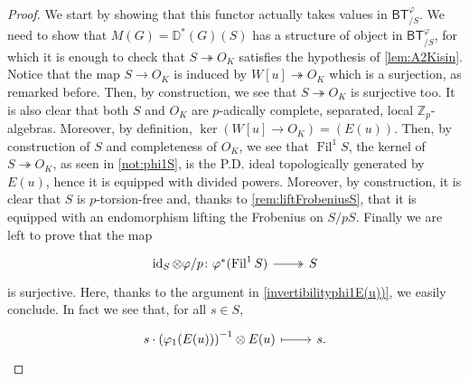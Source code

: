 \begin{proof}%
We start by showing that this functor actually takes values in $\mathsf{BT}^{\varphi}_{/S}$.
We need to show that $M(G) = \mathbb{D}^{*}(G)(S)$
has a structure of object in $\mathsf{BT}^{\varphi}_{/S}$, for which
it is enough to check that $S \twoheadrightarrow O_K$ satisfies
the hypothesis of \cref{lem:A2Kisin}.
Notice that the map $S \to O_K$ is induced by $W[u] \twoheadrightarrow O_K$
which is a surjection, as remarked before.
Then, by construction, we see that $S \twoheadrightarrow O_K$
is surjective too.
It is also clear that both $S$ and $O_K$ are 
$p$-adically complete, separated, local $\mathbb{Z}_{p}$-algebras.
Moreover, by definition, $\ker (W[u] \to O_K) = (E(u))$.
Then, by construction of $S$ and completeness of $O_K$,
we see that $\operatorname{Fil}^1 S$, the kernel of $S \twoheadrightarrow O_K$, 
as seen in \cref{not:phi1S}, is the P.D. ideal topologically generated by $E(u)$,
hence it is equipped with divided powers.
Moreover, by construction, it is clear that $S$ is $p$-torsion-free
and, thanks to \cref{rem:liftFrobeniusS},
that it is equipped with an endomorphism lifting the Frobenius on $S/pS$.
Finally we are left to prove that the map
\begin{equation*}
\begin{tikzcd}[row sep = 0ex
	,/tikz/column 1/.append style={anchor=base east}
	,/tikz/column 2/.append style={anchor=base west}]
	\id_{ S } \otimes \varphi/p \colon 
	\varphi^*(\operatorname{Fil}^1 S) \arrow[r, "", twoheadrightarrow] &
	S
\end{tikzcd}
\end{equation*} 
is surjective.
Here, thanks to the argument in \cref{invertibilityphi1E(u))}, we easily conclude.
In fact we see that, for all $s \in S$,
\begin{equation*}
\begin{tikzcd}[row sep = 0ex
	,/tikz/column 1/.append style={anchor=base east}
	,/tikz/column 2/.append style={anchor=base west}]
	s \cdot \left( \varphi_1(E(u)) \right)^{-1} \otimes E(u) 
	\arrow[r, "", mapsto] & 
	s
.\end{tikzcd}
\end{equation*} 




\end{proof}
